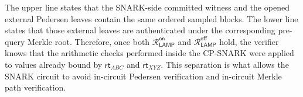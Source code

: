 \documentclass[conference,compsoc]{IEEEtran}
\newcommand{\rt}{\textsf{rt}}
\renewcommand{\enc}{\mathsf{Enc}}   %
\newcommand{\relation}{{\mathcal{R}}}
\newcommand{\protocol}{\textsf{LAMP}}   %
\theoremstyle{plain}
\theoremstyle{definition}
\theoremstyle{remark}
\begin{document}
The upper line states that the SNARK-side committed witness and the opened
external Pedersen leaves contain the same ordered sampled blocks.  The lower
line states that those external leaves are authenticated under the corresponding
pre-query Merkle root.  Therefore, once both
\(\relation_{\mathsf{LAMP}}^{\mathsf{on}}\) and
\(\relation_{\mathsf{LAMP}}^{\mathsf{off}}\) hold, the verifier knows that the
arithmetic checks performed inside the CP-SNARK were applied to values already
bound by \(\rt_{ABC}\) and \(\rt_{XYZ}\).  This separation is what allows the SNARK circuit to avoid in-circuit Pedersen verification and in-circuit Merkle path verification.





\end{document}
